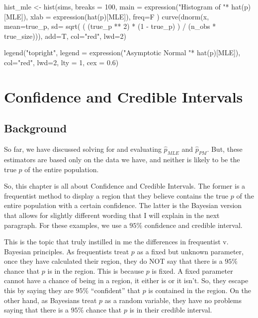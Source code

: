 \documentclass[
  letterpaper,
  DIV=11,
  numbers=noendperiod]{scrreprt}
\newenvironment{Shaded}{\begin{snugshade}}{\end{snugshade}}
\newcommand{\NormalTok}[1]{\textcolor[rgb]{0.00,0.23,0.31}{#1}}
\begin{document}
\begin{Shaded}
\begin{Highlighting}[]
\NormalTok{hist\_mle \textless{}{-} hist(sims, }
\NormalTok{     breaks = 100, }
\NormalTok{     main = expression("Histogram of "* hat(p)[MLE]), }
\NormalTok{     xlab = expression(hat(p)[MLE]),}
\NormalTok{     freq=F}
\NormalTok{)}
\NormalTok{curve(dnorm(x, mean=true\_p,}
\NormalTok{            sd= sqrt( ( (true\_p ** 2) * (1 {-} true\_p) ) / (n\_obs * true\_size))),}
\NormalTok{add=T, col="red", lwd=2)}

\NormalTok{legend("topright", legend = expression("Asymptotic Normal "* hat(p)[MLE]), }
\NormalTok{       col="red", lwd=2, lty = 1, cex = 0.6)}
\end{Highlighting}
\end{Shaded}


\chapter{Confidence and Credible
Intervals}\label{confidence-and-credible-intervals}

\section{Background}\label{background-4}

So far, we have discussed solving for and evaluating \(\hat{p}_{MLE}\)
and \(\hat{p}_{PM}\). But, these estimators are based only on the data
we have, and neither is likely to be the true \(p\) of the entire
population.

So, this chapter is all about Confidence and Credible Intervals. The
former is a frequentist method to display a region that they believe
contains the true \(p\) of the entire population with a certain
confidence. The latter is the Bayesian version that allows for slightly
different wording that I will explain in the next paragraph. For these
examples, we use a \(95\%\) confidence and credible interval.

This is the topic that truly instilled in me the differences in
frequentist v. Bayesian principles. As frequentists treat \(p\) as a
fixed but unknown parameter, once they have calculated their region,
they do NOT say that there is a \(95\%\) chance that \(p\) is in the
region. This is because \(p\) is fixed. A fixed parameter cannot have a
chance of being in a region, it either is or it isn't. So, they escape
this by saying they are \(95\%\) ``confident'' that \(p\) is contained
in the region. On the other hand, as Bayesians treat \(p\) as a random
variable, they have no problems saying that there is a \(95\%\) chance
that \(p\) is in their credible interval.
\end{document}
